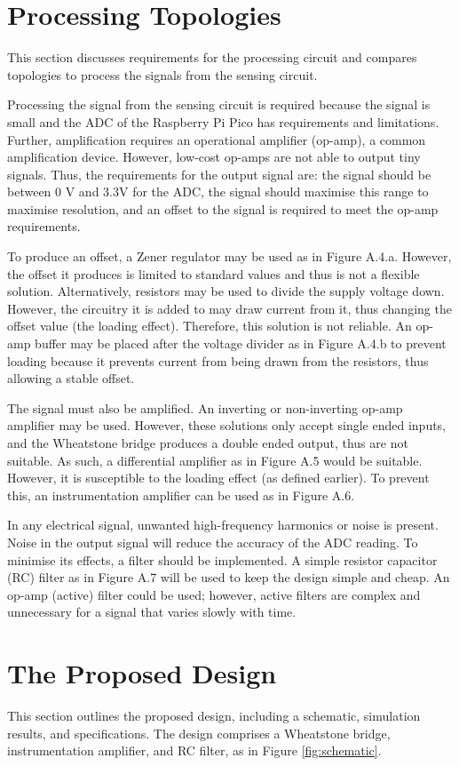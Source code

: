 \section{Processing Topologies}
This section discusses requirements for the processing circuit and compares topologies to process the signals from the sensing circuit.

Processing the signal from the sensing circuit is required because the signal is small and the ADC of the Raspberry Pi Pico has requirements and limitations. Further, amplification requires an operational amplifier (op-amp), a common amplification device. However, low-cost op-amps are not able to output tiny signals. Thus, the requirements for the output signal are: the signal should be between 0 V and 3.3V for the ADC, the signal should maximise this range to maximise resolution, and an offset to the signal is required to meet the op-amp requirements.

To produce an offset, a Zener regulator may be used as in Figure A.4.a. However, the offset it produces is limited to standard values and thus is not a flexible solution. Alternatively, resistors may be used to divide the supply voltage down. However, the circuitry it is added to may draw current from it, thus changing the offset value (the loading effect). Therefore, this solution is not reliable. An op-amp buffer may be placed after the voltage divider as in Figure A.4.b to prevent loading because it prevents current from being drawn from the resistors, thus allowing a stable offset.

The signal must also be amplified. An inverting or non-inverting op-amp amplifier may be used. However, these solutions only accept single ended inputs, and the Wheatstone bridge produces a double ended output, thus are not suitable. As such, a differential amplifier as in Figure A.5 would be suitable. However, it is susceptible to the loading effect (as defined earlier). To prevent this, an instrumentation amplifier can be used as in Figure A.6.

In any electrical signal, unwanted high-frequency harmonics or noise is present. Noise in the output signal will reduce the accuracy of the ADC reading. To minimise its effects, a filter should be implemented. A simple resistor capacitor (RC) filter as in Figure A.7 will be used to keep the design simple and cheap. An op-amp (active) filter could be used; however, active filters are complex and unnecessary for a signal that varies slowly with time.


\section{The Proposed Design}
This section outlines the proposed design, including a schematic, simulation results, and specifications. The design comprises a Wheatstone bridge, instrumentation amplifier, and RC filter, as in Figure \ref{fig:schematic}.

